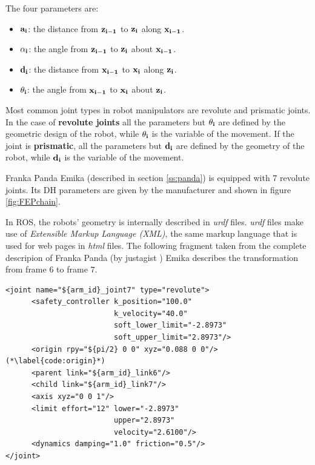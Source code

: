 The four parameters are:

\begin{itemize}
    \item $\bf{a_i}$: the distance from $\bf{z_{i-1}}$ to $\bf{z_{i}}$ along $\bf{x_{i-1}}$.
    \item $\bf{\alpha_i}$: the angle from $\bf{z_{i-1}}$ to $\bf{z_{i}}$ about $\bf{x_{i-1}}$.
    \item $\bf{d_i}$: the distance from $\bf{x_{i-1}}$ to $\bf{x_{i}}$ along $\bf{z_{i}}$.
    \item $\bf{\theta_i}$: the angle from $\bf{x_{i-1}}$ to $\bf{x_{i}}$ about $\bf{z_{i}}$.
\end{itemize}

Most common joint types in robot manipulators are revolute and prismatic joints. In the case of \textbf{revolute joints} all the parameters but $\bf{\theta_i}$ are defined by the geometric design of the robot, while $\bf{\theta_i}$ is the variable of the movement. If the joint is \textbf{prismatic}, all the parameters but $\bf{d_i}$ are defined by the geometry of the robot, while $\bf{d_i}$ is the variable of the movement.

Franka Panda Emika (described in section \ref{ss:panda}) is equipped with 7 revolute joints. Its DH parameters are given by the manufacturer and shown in figure \ref{fig:FEPchain}.

In ROS, the robots' geometry is internally described in \textit{urdf} files. \textit{urdf} files make use of \textit{Extensible Markup Language (XML)}, the same markup language that is used for web pages in \textit{html} files. The following fragment taken from the complete descripion of Franka Panda (by justagist \cite{justagist}) Emika describes the transformation from frame $6$ to frame $7$.

\begin{lstlisting}[caption={Fragment of panda\_arm.urdf},captionpos=b]
<joint name="${arm_id}_joint7" type="revolute">
      <safety_controller k_position="100.0"
                         k_velocity="40.0"
                         soft_lower_limit="-2.8973"
                         soft_upper_limit="2.8973"/>
      <origin rpy="${pi/2} 0 0" xyz="0.088 0 0"/> (*\label{code:origin}*)
      <parent link="${arm_id}_link6"/>
      <child link="${arm_id}_link7"/>
      <axis xyz="0 0 1"/>
      <limit effort="12" lower="-2.8973"
                         upper="2.8973"
                         velocity="2.6100"/>
      <dynamics damping="1.0" friction="0.5"/>
</joint>
\end{lstlisting}

